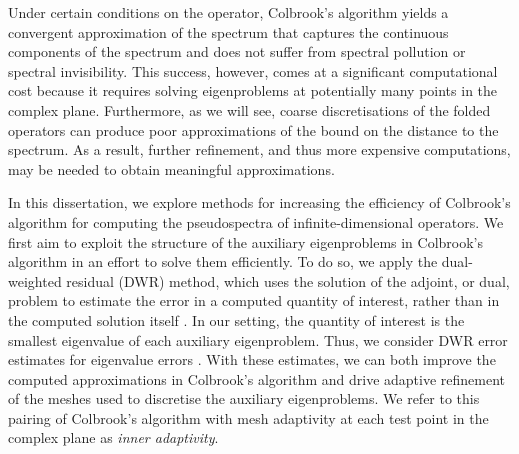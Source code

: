 Under certain conditions on the operator, Colbrook's algorithm yields a convergent approximation of the spectrum that captures the continuous components of the spectrum and does not suffer from spectral pollution or spectral invisibility. This success, however, comes at a significant computational cost because it requires solving eigenproblems at potentially many points in the complex plane. Furthermore, as we will see, coarse discretisations of the folded operators can produce poor approximations of the bound on the distance to the spectrum. 
As a result, further refinement, and thus more expensive computations, may be needed to obtain meaningful approximations.







In this dissertation, we explore methods for increasing the efficiency of Colbrook's algorithm for computing the pseudospectra of infinite-dimensional operators. We first aim to exploit the structure of the auxiliary eigenproblems in Colbrook's algorithm in an effort to solve them efficiently. To do so, we apply the dual-weighted residual (DWR) method, which uses the solution of the adjoint, or dual, problem to estimate the error in a computed quantity of interest, rather than in the computed solution itself \cite{Giles97, Becker, ActaGiles,Bangerth}. In our setting, the quantity of interest is the smallest eigenvalue of each auxiliary eigenproblem. Thus, we consider DWR error estimates for eigenvalue errors \cite{Heuveline}. With these estimates, we can both improve the computed approximations in Colbrook's algorithm and drive adaptive refinement of the meshes used to discretise the auxiliary eigenproblems.
 We refer to this pairing of Colbrook's algorithm with mesh adaptivity at each test point in the complex plane as \textit{inner adaptivity}.
 
